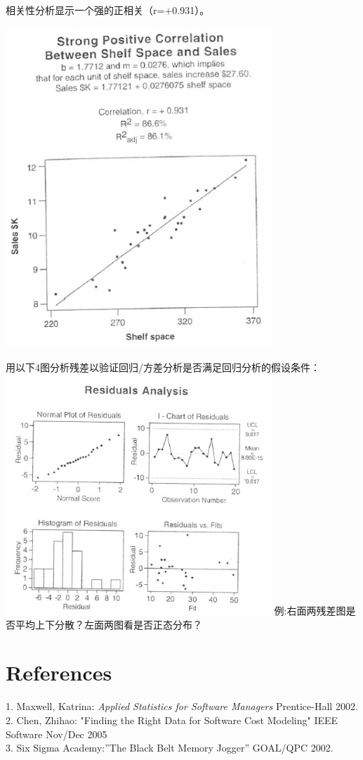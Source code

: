 相关性分析显示一个强的正相关（r=+0.931）。


\includegraphics[width=10cm]{相关性13.png}

用以下4图分析残差以验证回归/方差分析是否满足回归分析的假设条件：\\

\includegraphics[width=10cm]{相关性15.png}
例:右面两残差图是否平均上下分散？左面两图看是否正态分布？

\hypertarget{references}{%
\section{References}\label{references}}

1. Maxwell, Katrina: \emph{Applied Statistics for Software Managers}
Prentice-Hall 2002.\\
2. Chen, Zhihao: "Finding the Right Data for Software Cost Modeling"
IEEE Software Nov/Dec 2005\\
3. Six Sigma Academy:''The Black Belt Memory Jogger'' GOAL/QPC 2002.\\




